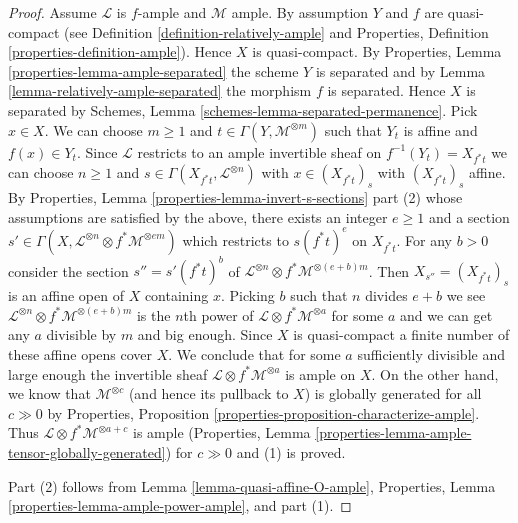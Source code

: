 \documentclass[10pt,a4paper]{amsart}
\theoremstyle{plain}
\theoremstyle{definition}
\theoremstyle{remark}
\numberwithin{equation}{subsection}
\begin{document}
\begin{proof}
Assume $\mathcal{L}$ is $f$-ample and $\mathcal{M}$ ample.
By assumption $Y$ and $f$ are quasi-compact (see
Definition \ref{definition-relatively-ample} and
Properties, Definition \ref{properties-definition-ample}).
Hence $X$ is quasi-compact. By Properties, Lemma
\ref{properties-lemma-ample-separated} the scheme $Y$ is
separated and by Lemma \ref{lemma-relatively-ample-separated}
the morphism $f$ is separated. Hence $X$ is separated by
Schemes, Lemma \ref{schemes-lemma-separated-permanence}.
Pick $x \in X$. We can choose $m \geq 1$
and $t \in \Gamma(Y, \mathcal{M}^{\otimes m})$ such that $Y_t$
is affine and $f(x) \in Y_t$. Since $\mathcal{L}$ restricts to an
ample invertible sheaf on $f^{-1}(Y_t) = X_{f^*t}$
we can choose $n \geq 1$ and $s \in \Gamma(X_{f^*t}, \mathcal{L}^{\otimes n})$
with $x \in (X_{f^*t})_s$ with $(X_{f^*t})_s$ affine.
By Properties, Lemma \ref{properties-lemma-invert-s-sections} part (2)
whose assumptions are satisfied by the above,
there exists an integer $e \geq 1$ and a section
$s' \in \Gamma(X, \mathcal{L}^{\otimes n} \otimes f^*\mathcal{M}^{\otimes em})$
which restricts to $s(f^*t)^e$ on $X_{f^*t}$. For any $b > 0$
consider the section $s'' = s'(f^*t)^b$ of
$\mathcal{L}^{\otimes n} \otimes f^*\mathcal{M}^{\otimes (e + b)m}$.
Then $X_{s''} = (X_{f^*t})_s$ is an affine open of $X$ containing $x$.
Picking $b$ such that $n$ divides $e + b$ we see
$\mathcal{L}^{\otimes n} \otimes f^*\mathcal{M}^{\otimes (e + b)m}$
is the $n$th power of $\mathcal{L} \otimes f^*\mathcal{M}^{\otimes a}$
for some $a$ and we can get any $a$ divisible by $m$ and big enough.
Since $X$ is quasi-compact a finite number of these affine opens
cover $X$. We conclude that for some $a$ sufficiently divisible and
large enough the invertible sheaf
$\mathcal{L} \otimes f^*\mathcal{M}^{\otimes a}$ is ample on $X$.
On the other hand, we know that $\mathcal{M}^{\otimes c}$
(and hence its pullback to $X$) is globally generated for all $c \gg 0$
by Properties, Proposition \ref{properties-proposition-characterize-ample}.
Thus $\mathcal{L} \otimes f^*\mathcal{M}^{\otimes a + c}$ is ample
(Properties, Lemma \ref{properties-lemma-ample-tensor-globally-generated})
for $c \gg 0$ and (1) is proved.

\medskip\noindent
Part (2) follows from Lemma \ref{lemma-quasi-affine-O-ample},
Properties, Lemma \ref{properties-lemma-ample-power-ample}, and
part (1).
\end{proof}
\end{document}
